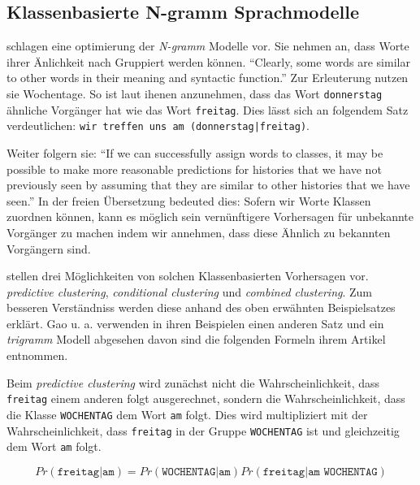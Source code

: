 \subsection{Klassenbasierte N-gramm Sprachmodelle}
\label{sec:brownClustering}
    
    \cite{cumpatationalLinguistics:classBasedNGramms} schlagen eine optimierung der \emph{N-gramm} Modelle vor. Sie nehmen an, dass Worte ihrer Änlichkeit nach Gruppiert werden können. \enquote{Clearly, some words are similar to other words in their meaning and syntactic function.} \parencite[S. 470]{cumpatationalLinguistics:classBasedNGramms} Zur Erleuterung nutzen sie Wochentage. So ist laut ihenen anzunehmen, dass das Wort \texttt{donnerstag} ähnliche Vorgänger hat wie das Wort \texttt{freitag}. Dies lässt sich an folgendem Satz verdeutlichen: \texttt{wir treffen uns am (donnerstag|freitag)}. 
    
    Weiter folgern sie: \enquote{If we can successfully assign words to classes, it may be possible to make more reasonable predictions for histories that we have not previously seen by assuming that they are similar to other histories that we have seen.} \parencite[S. 471]{cumpatationalLinguistics:classBasedNGramms} In der freien Übersetzung bedeuted dies: Sofern wir Worte Klassen zuordnen können, kann es möglich sein vernünftigere Vorhersagen für unbekannte Vorgänger zu machen indem wir annehmen, dass diese Ähnlich zu bekannten Vorgängern sind.
    
    \cite{cumpatationalLinguistics:theuse} stellen drei Möglichkeiten von solchen Klassenbasierten Vorhersagen vor. \emph{predictive clustering}, \emph{conditional clustering} und \emph{combined clustering}. Zum besseren Verständniss werden diese anhand des oben erwähnten Beispielsatzes erklärt. Gao u. a. verwenden in ihren Beispielen einen anderen Satz und ein \emph{trigramm} Modell abgesehen davon sind die folgenden Formeln ihrem Artikel entnommen. 
    
    Beim \emph{predictive clustering} wird zunächst nicht die Wahrscheinlichkeit, dass \texttt{freitag} einem anderen folgt ausgerechnet, sondern die Wahrscheinlichkeit, dass die Klasse \texttt{WOCHENTAG} dem Wort \texttt{am} folgt. Dies wird multipliziert mit der Wahrscheinlichkeit, dass \texttt{freitag} in der Gruppe \texttt{WOCHENTAG} ist und gleichzeitig dem Wort \texttt{am} folgt.
   	
     \begin{equation}
   		Pr(\texttt{freitag}|\texttt{am}) = Pr(\texttt{WOCHENTAG}|\texttt{am}) Pr(\texttt{freitag}|\texttt{am WOCHENTAG})
        \label{eq:predictive-clustering-words}
	\end{equation}
    
